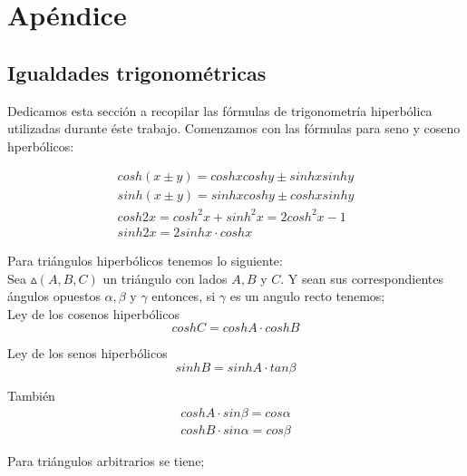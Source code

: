 



\chapter{Ap\'endice}
\label{cha:apendice}

\section{Igualdades trigonom\'etricas}

Dedicamos esta secci\'on a recopilar las f\'ormulas de trigonometr\'ia hiperb\'olica utilizadas durante \'este trabajo. Comenzamos con las f\'ormulas para seno y coseno hperb\'olicos:

 \begin{eqnarray}
 cosh(x \pm y)= coshxcoshy \pm sinhxsinhy \\
 sinh(x \pm y)=sinhxcoshy \pm coshxsinhy \\
 cosh2x=cosh^{2}x+sinh^{2}x=2cosh^{2}x-1 \\
 sinh2x = 2sinhx\cdot coshx
 \end{eqnarray}

 Para tri\'angulos hiperb\'olicos tenemos lo siguiente: \\

 Sea $\vartriangle (A,B,C)$ un tri\'angulo con lados $A, B $ y $ C$. Y sean sus correspondientes \'angulos opuestos $\alpha,\beta$ y $\gamma$ entonces, si $\gamma$ es un angulo recto tenemos; \\

 Ley de los cosenos hiperb\'olicos
 \begin{equation}
 cosh C = cosh A\cdot cosh B
 \end{equation}

 Ley de los senos hiperb\'olicos
 \begin{equation}
 sinhB = sinhA \cdot tan \beta
 \end{equation}

 Tambi\'en
 \begin{eqnarray}
 cosh A \cdot sin \beta = cos \alpha  \\
 coshB \cdot sin \alpha= cos \beta
 \end{eqnarray}

 Para tri\'angulos arbitrarios se tiene; \\

